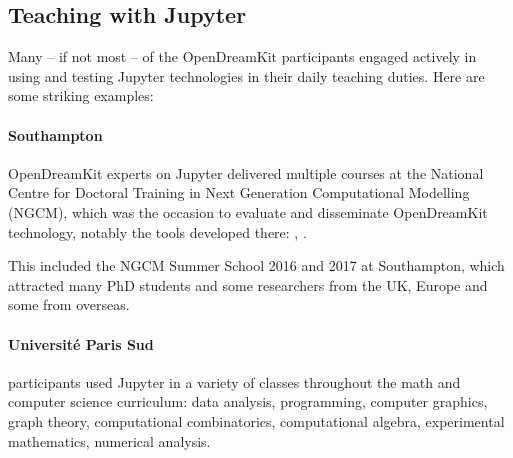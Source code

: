 \documentclass{deliverablereport}
\begin{document}



\subsection{Teaching with Jupyter}


Many -- if not most -- of the OpenDreamKit participants engaged
actively in using and testing Jupyter technologies in their daily
teaching duties. Here are some striking examples:

\paragraph{Southampton}

  OpenDreamKit experts on Jupyter delivered
  multiple courses at the National Centre for Doctoral Training in
  Next Generation Computational Modelling (NGCM), which was the
  occasion to evaluate and disseminate OpenDreamKit technology,
  notably the tools developed there: ,
  .

  This included the NGCM Summer School 2016 and 2017 at Southampton,
  which attracted many PhD students and some researchers from the UK,
  Europe and some from overseas.

\paragraph{Université Paris Sud}
  \ODK participants used Jupyter in a variety of classes throughout
  the math and computer science curriculum:
  data analysis, programming, computer graphics, graph theory,
  computational combinatorics, computational algebra, experimental
  mathematics, numerical analysis.
\end{document}
